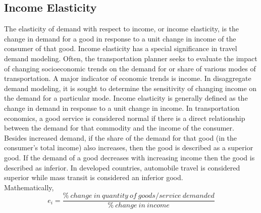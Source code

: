 \subsection{Income Elasticity}
The elasticity of demand with respect to income, or income elasticity, is the change in demand for a good in response to a unit change in income of the consumer of that good. Income elasticity has a special significance in travel demand modeling. Often, the transportation planner seeks to evaluate the impact of changing socioeconomic trends on the demand for or share of various modes of transportation. A major indicator of economic trends is income. In disaggregate demand modeling, it is sought to determine the sensitivity of changing income on the demand for a particular mode. Income elasticity is generally defined as the change in demand in response to a unit change in income. In transportation economics, a good service is considered normal if there is a direct relationship between the demand for that commodity and the income of the consumer. Besides increased demand, if the share of the demand for that good (in the consumer’s total income) also increases, then the good is described as a superior good. If the demand of a good decreases with increasing income then the good is described as inferior. In developed countries, automobile travel is considered superior while mass transit is considered an inferior good.\\
Mathematically,
\begin{equation}
	e_i = \frac{\% \: change \: in \: quantity \: of \:goods/service\: demanded}{\% \: change \: in \: income}
\end{equation}
